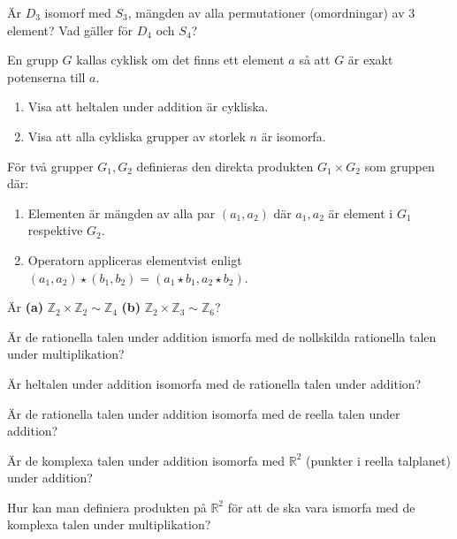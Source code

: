 \documentclass[11pt,fleqn]{book} %
\begin{document}
\begin{problem}
  Är \(D_3\) isomorf med \(S_3\), mängden av alla permutationer (omordningar) av 3 element? Vad gäller för \(D_4\) och \(S_4\)?
\end{problem}

\begin{problem} En grupp \(G\) kallas cyklisk om det finns ett element \(a\) så att \(G\) är exakt potenserna till \(a\). 
  \begin{enumerate}[label=\textbf{\alph*)} ]
    \item Visa att heltalen under addition är cykliska.
    \item Visa att alla cykliska grupper av storlek \(n\) är isomorfa.
  \end{enumerate}
  
\end{problem}

\begin{problem}
  För två grupper \(G_1, G_2\) definieras den direkta produkten \(G_1 \times G_2\) som gruppen där:
  \begin{enumerate}
    \item Elementen är mängden av alla par \((a_1, a_2)\) där \(a_1, a_2\) är element i \(G_1\) respektive \(G_2\).
    \item Operatorn appliceras elementvist enligt \((a_1, a_2)  \star (b_1, b_2) = (a_1  \star b_1, a_2  \star b_2)\).
  \end{enumerate}
  Är \textbf{(a)} \(\mathbb{Z} _2 \times \mathbb{Z} _2 \sim \mathbb{Z} _4\) \textbf{(b)} \(\mathbb{Z} _2 \times \mathbb{Z} _3 \sim \mathbb{Z} _6\)? %
\end{problem}

\begin{problem} %
  Är de rationella talen under addition ismorfa med de nollskilda rationella talen under multiplikation?
\end{problem}

\begin{problem}
  Är heltalen under addition isomorfa med de rationella talen under addition?
\end{problem}

\begin{problem}
  Är de rationella talen under addition isomorfa med de reella talen under addition?
\end{problem}

\begin{problem}
  Är de komplexa talen under addition isomorfa med \(\mathbb{R} ^2\) (punkter i reella talplanet) under addition?
\end{problem}

\begin{problem}
  Hur kan man definiera produkten på \(\mathbb{R} ^2\) för att de ska vara ismorfa med de komplexa talen under multiplikation?
\end{problem}


\end{document}
